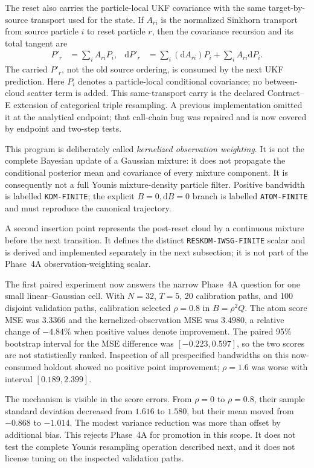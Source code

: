 \documentclass[11pt]{article}
\newcommand{\dd}{\mathrm{d}}
\begin{document}
The reset also carries the particle-local UKF covariance with the same
target-by-source transport used for the state.  If $A_{ri}$ is the normalized
Sinkhorn transport from source particle $i$ to reset particle $r$, then the
covariance recursion and its total tangent are
\begin{align}
 P'_{r} &= \sum_i A_{ri}P_i, &
 \dd P'_{r} &= \sum_i (\dd A_{ri})P_i+
                    \sum_i A_{ri}\dd P_i.\label{eq:covariance-carry}
\end{align}
The carried $P'_r$, not the old source ordering, is consumed by the next UKF
prediction.  Here $P_i$ denotes a particle-local conditional covariance; no
between-cloud scatter term is added.  This same-transport carry is the
declared Contract--E extension of categorical triple resampling.  A previous
implementation omitted it at the analytical endpoint; that call-chain bug
was repaired and is now covered by endpoint and two-step tests.

This program is deliberately called \emph{kernelized observation weighting}.
It is not the complete Bayesian update of a Gaussian mixture: it does not
propagate the conditional posterior mean and covariance of every mixture
component.  It is consequently not a full Younis mixture-density particle
filter.  Positive bandwidth is labelled \texttt{KDM-FINITE}; the explicit
$B=0,\dd B=0$ branch is labelled \texttt{ATOM-FINITE} and must reproduce the
canonical trajectory.

A second insertion point represents the post-reset cloud by a continuous
mixture before the next transition.  It defines the distinct
\texttt{RESKDM-IWSG-FINITE} scalar and is derived and implemented separately
in the next subsection; it is not part of the Phase~4A
observation-weighting scalar.

The first paired experiment now answers the narrow Phase~4A question for one
small linear--Gaussian cell.  With $N=32$, $T=5$, 20 calibration paths, and
100 disjoint validation paths, calibration selected $\rho=0.8$ in
$B=\rho^2Q$.  The atom score MSE was $3.3366$ and the kernelized-observation
MSE was $3.4980$, a relative change of $-4.84\%$ when positive values denote
improvement.  The paired 95\% bootstrap interval for the MSE difference was
$[-0.223,0.597]$, so the two scores are not statistically ranked.  Inspection
of all prespecified bandwidths on this now-consumed holdout showed no positive
point improvement; $\rho=1.6$ was worse with interval $[0.189,2.399]$.

The mechanism is visible in the score errors.  From $\rho=0$ to $\rho=0.8$,
their sample standard deviation decreased from $1.616$ to $1.580$, but their
mean moved from $-0.868$ to $-1.014$.  The modest variance reduction was more
than offset by additional bias.  This rejects Phase~4A for promotion in this
scope.  It does not test the complete Younis resampling operation described
next, and it does not license tuning on the inspected validation paths.
\end{document}
